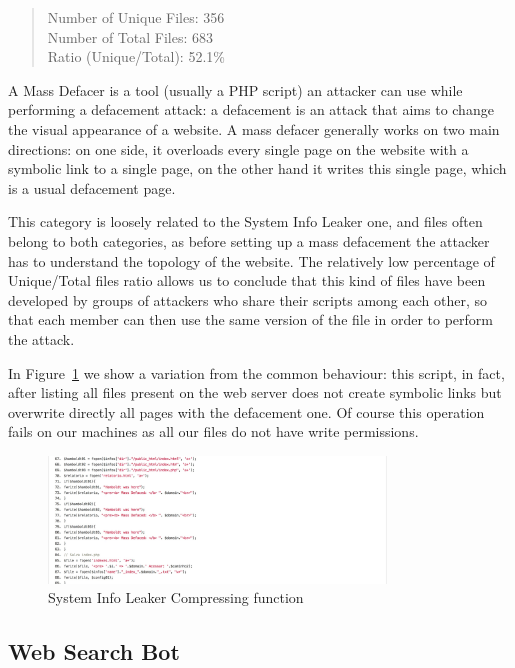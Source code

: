 \begin{quote}
Number of Unique Files: 356\\
Number of Total Files: 683\\
Ratio (Unique/Total): 52.1\%
\end{quote}

A Mass Defacer is a tool (usually a PHP script) an attacker can use while performing a defacement attack: a defacement is an attack that aims to change the visual appearance of a website. A mass defacer generally works on two main directions: on one side, it overloads every single page on the website with a symbolic link to a single page, on the other hand it writes this single page, which is a usual defacement page.

This category is loosely related to the System Info Leaker one, and files often belong to both categories, as before setting up a mass defacement the attacker has to understand the topology of the website. The relatively low percentage of Unique/Total files ratio allows us to conclude that this kind of files have been developed by groups of attackers who share their scripts among each other, so that each member can then use the same version of the file in order to perform the attack.

In Figure~\ref{fig:massDefacement} we show a variation from the common behaviour: this script, in fact, after listing all files present on the web server does not create symbolic links but overwrite directly all pages with the defacement one. Of course this operation fails on our machines as all our files do not have write permissions.

\begin{figure}[H]
\centerline{\includegraphics[width=0.8\textwidth]{Images/massDefacement.jpg}}
\caption{System Info Leaker Compressing function\label{fig:massDefacement}}
\end{figure}

\subsection{Web Search Bot}

